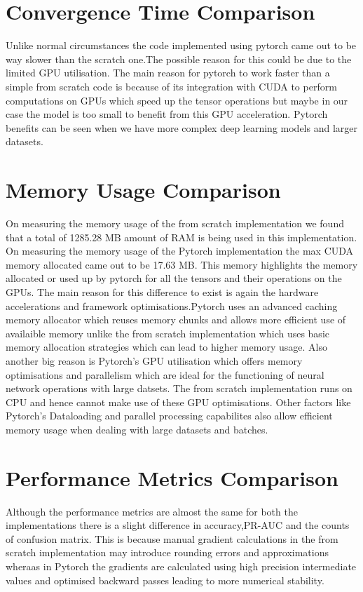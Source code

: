 \documentclass[12pt]{article}
\begin{document}
\section{Convergence Time Comparison}
Unlike normal circumstances the code implemented using pytorch came out to be way slower than the scratch one.The possible reason for this could be due to the limited GPU utilisation.
The main reason for pytorch to work faster than a simple from scratch code is because of its integration with CUDA to perform computations on GPUs which speed up the tensor operations but maybe in our case the model is too small to benefit from this GPU acceleration.
Pytorch benefits can be seen when we have more complex deep learning models and larger datasets.
\section{Memory Usage Comparison}
On measuring the memory usage of the from scratch implementation we found that a total of 1285.28 MB amount of RAM is being used in this implementation.
On measuring the memory usage of the Pytorch implementation the max CUDA memory allocated came out to be 17.63 MB. This memory highlights the memory allocated or used up by pytorch for all the tensors and their operations on the GPUs.
The main reason for this difference to exist is again the hardware accelerations and framework optimisations.Pytorch uses an advanced caching memory allocator which reuses memory chunks and allows more efficient use of availaible memory unlike the from scratch implementation which uses basic memory allocation strategies which can lead to higher memory usage.
Also another big reason is Pytorch's GPU utilisation which offers memory optimisations and parallelism which are ideal for the functioning of neural network operations with large datsets. The from scratch implementation runs on CPU and hence cannot make use of these GPU optimisations.
Other factors like Pytorch's Dataloading and parallel processing capabilites also allow efficient memory usage when dealing with large datasets and batches.
\section{Performance Metrics Comparison}
Although the performance metrics are almost the same for both the implementations there is a slight difference in accuracy,PR-AUC and the counts of confusion matrix. This is because manual gradient calculations in the from scratch implementation may introduce rounding errors and approximations wheraas in Pytorch the gradients are calculated using high precision intermediate values and optimised backward passes leading to more numerical stability.
\end{document}
